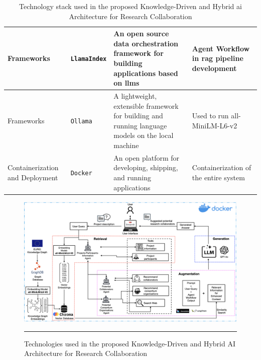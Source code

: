 \begin{table}[htbp]
\begin{tabularx}{\textwidth}{|>{\centering\arraybackslash}p{2cm}|>{\centering\arraybackslash}p{2.5cm}|X|X|}
        \hline
        Frameworks & \texttt{LlamaIndex} & An open source data orchestration framework for building applications based on \glspl{llm} & Agent Workflow in \gls{rag} pipeline development\\
        \hline
        Frameworks & \texttt{Ollama} & A lightweight, extensible framework for building and running language models on the local machine & Used to run all-MiniLM-L6-v2\\
        \hline
        Containerization and Deployment & \texttt{Docker} & An open platform for developing, shipping, and running applications & Containerization of the entire system\\
        \hline
    \end{tabularx}
    \caption{Technology stack used in the proposed Knowledge-Driven and Hybrid \gls{ai} Architecture for Research Collaboration}
    \label{tab:technology-stack}
\end{table}

\begin{figure}[htbp]
    \centering
 \includegraphics[width=.9\textwidth]{figures/implementation/proposed-system-graphRAG-technologies.png}
     \rule{35em}{0.5pt}
    \caption{Technologies used in the proposed Knowledge-Driven and Hybrid AI Architecture for Research Collaboration}
 \label{fig:proposed-system-graphRAG-technologies}
\end{figure}

